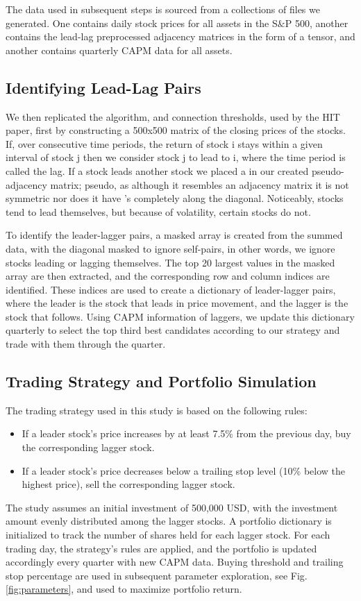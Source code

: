 \documentclass{article}
\begin{document}
The data used in subsequent steps is sourced from a collections of files we generated. One contains daily stock prices for all assets in the S$\&$P 500, another contains the lead-lag preprocessed adjacency matrices in the form of a tensor, and another contains quarterly CAPM data for all assets.
\subsection{Identifying Lead-Lag Pairs}
We then replicated the algorithm, and connection thresholds, used by the HIT paper, first by constructing a 500x500 matrix of the closing prices of the stocks. If, over consecutive time periods, the return of stock {\selectfont
i} stays within a given interval of stock {\selectfont
j} then we consider stock {\selectfont
j} to lead to {\selectfont
i}, where the time period is called the lag. If a stock leads another stock we placed a {} in our created pseudo-adjacency matrix; pseudo, as although it resembles an adjacency matrix it is not symmetric nor does it have {}'s completely along the diagonal. Noticeably, stocks tend to lead themselves, but because of volatility, certain stocks do not. 

To identify the leader-lagger pairs, a masked array is created from the summed data, with the diagonal masked to ignore self-pairs, in other words, we ignore stocks leading or lagging themselves. The top 20 largest values in the masked array are then extracted, and the corresponding row and column indices are identified. These indices are used to create a dictionary of leader-lagger pairs, where the leader is the stock that leads in price movement, and the lagger is the stock that follows. Using CAPM information of laggers, we update this dictionary quarterly to select the top third best candidates according to our strategy and trade with them through the quarter.
\subsection{Trading Strategy and Portfolio Simulation}
The trading strategy used in this study is based on the following rules:
\begin{itemize}
    \item If a leader stock's price increases by at least 7.5\% from the previous day, buy the corresponding lagger stock.
    \item If a leader stock's price decreases below a trailing stop level (10\% below the highest price), sell the corresponding lagger stock.
\end{itemize}
The study assumes an initial investment of 500,000 USD, with the investment amount evenly distributed among the lagger stocks. A portfolio dictionary is initialized to track the number of shares held for each lagger stock. For each trading day, the strategy's rules are applied, and the portfolio is updated accordingly every quarter with new CAPM data. Buying threshold and trailing stop percentage are used in subsequent parameter exploration, see Fig. \ref{fig:parameters}, and used to maximize portfolio return.
\end{document}
